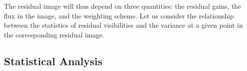 %
%
%

\pg
The residual image will thus depend on three quantities: the residual gains, the flux in the image, and the weighting scheme. Let us consider the relationship between the statistics of residual visibilities and the variance at a given point in the corresponding residual image.

\subsection{Statistical Analysis}

